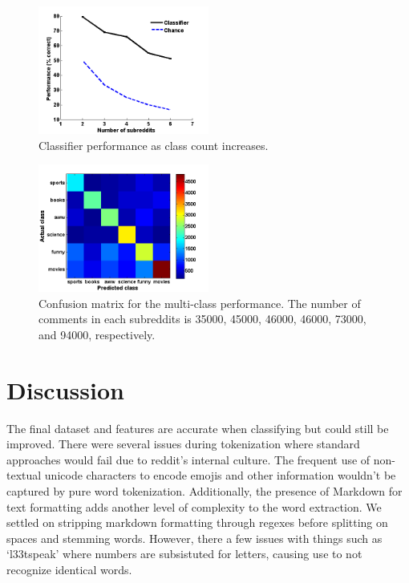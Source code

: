 \documentclass[10pt,twocolumn]{article}
\begin{document}
\begin{figure}
    \centering
  	\includegraphics[width=0.5\textwidth]{./varyWBaseline.png}
  	\caption{Classifier performance as class count increases.}
  	\label{classes}
\end{figure}	

\begin{figure}
    \centering
  	\includegraphics[width=0.5\textwidth]{./confusion_mat.png}
  	\caption{Confusion matrix for the multi-class performance. The number of comments in each subreddits is 35000, 45000, 46000, 46000, 73000, and 94000, respectively.}
  	\label{confusion}
\end{figure}	

\section{Discussion}
The final dataset and features are accurate when classifying but could still be improved. There were several issues during tokenization where standard approaches would fail due to reddit's internal culture. The frequent use of non-textual unicode characters to encode emojis and other information wouldn't be captured by pure word tokenization. Additionally, the presence of Markdown for text formatting adds another level of complexity to the word extraction. We settled on stripping markdown formatting through regexes before splitting on spaces and stemming words. However, there a few issues with things such as `l33tspeak' where numbers are subsistuted for letters, causing use to not recognize identical words. 
\end{document}
